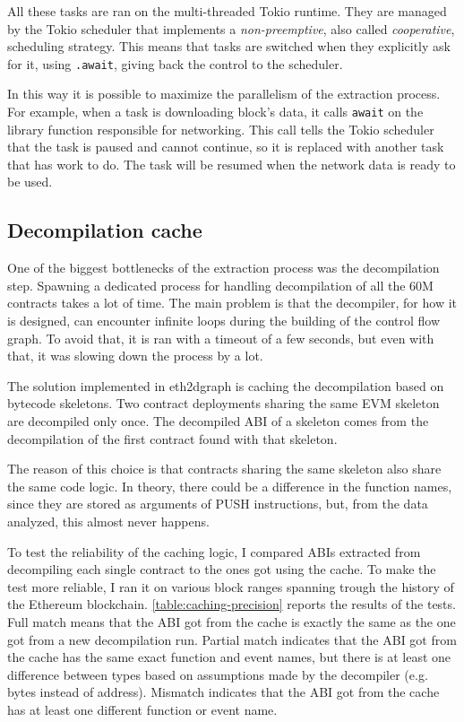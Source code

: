 All these tasks are ran on the multi-threaded Tokio runtime. They are managed by the Tokio scheduler that implements a \textit{non-preemptive}, also called \textit{cooperative}, scheduling strategy. This means that tasks are switched when they explicitly ask for it, using \lstinline{.await}, giving back the control to the scheduler. 

In this way it is possible to maximize the parallelism of the extraction process. For example, when a task is downloading block's data, it calls \texttt{await} on the library function responsible for networking. This call tells the Tokio scheduler that the task is paused and cannot continue, so it is replaced with another task that has work to do. The task will be resumed when the network data is ready to be used.

\subsection{Decompilation cache}
\label{cachine-section}
One of the biggest bottlenecks of the extraction process was the decompilation step. Spawning a dedicated process for handling decompilation of all the 60M contracts takes a lot of time. The main problem is that the decompiler, for how it is designed, can encounter infinite loops during the building of the control flow graph. To avoid that, it is ran with a timeout of a few seconds, but even with that, it was slowing down the process by a lot.

The solution implemented in eth2dgraph is caching the decompilation based on bytecode skeletons. Two contract deployments sharing the same EVM skeleton are decompiled only once. The decompiled ABI of a skeleton comes from the decompilation of the first contract found with that skeleton.

The reason of this choice is that contracts sharing the same skeleton also share the same code logic. In theory, there could be a difference in the function names, since they are stored as arguments of PUSH instructions, but, from the data analyzed, this almost never happens.

To test the reliability of the caching logic, I compared ABIs extracted from decompiling each single contract to the ones got using the cache. To make the test more reliable, I ran it on various block ranges spanning trough the history of the Ethereum blockchain. \cref{table:caching-precision} reports the results of the tests. Full match means that the ABI got from the cache is exactly the same as the one got from a new decompilation run. Partial match indicates that the ABI got from the cache has the same exact function and event names, but there is at least one difference between types based on assumptions made by the decompiler (e.g. bytes instead of address). Mismatch indicates that the ABI got from the cache has at least one different function or event name.

